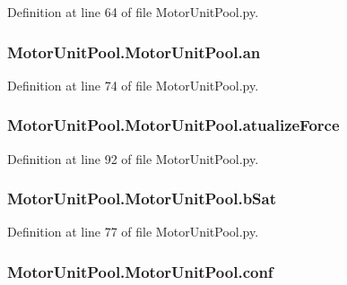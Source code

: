 Definition at line 64 of file Motor\-Unit\-Pool.\-py.

\hypertarget{class_motor_unit_pool_1_1_motor_unit_pool_ac72c67b4a1f6134965ab77e2d798b5a4}{
\subsubsection[{an}]{\setlength{\rightskip}{0pt plus 5cm}Motor\-Unit\-Pool.\-Motor\-Unit\-Pool.\-an}}\label{class_motor_unit_pool_1_1_motor_unit_pool_ac72c67b4a1f6134965ab77e2d798b5a4}


Definition at line 74 of file Motor\-Unit\-Pool.\-py.

\hypertarget{class_motor_unit_pool_1_1_motor_unit_pool_a21f9a6a5d113b5b0f67a3557c47ebd5a}{
\subsubsection[{atualize\-Force}]{\setlength{\rightskip}{0pt plus 5cm}Motor\-Unit\-Pool.\-Motor\-Unit\-Pool.\-atualize\-Force}}\label{class_motor_unit_pool_1_1_motor_unit_pool_a21f9a6a5d113b5b0f67a3557c47ebd5a}


Definition at line 92 of file Motor\-Unit\-Pool.\-py.

\hypertarget{class_motor_unit_pool_1_1_motor_unit_pool_a4e107835e34b4f56d06b9b28c143fe40}{
\subsubsection[{b\-Sat}]{\setlength{\rightskip}{0pt plus 5cm}Motor\-Unit\-Pool.\-Motor\-Unit\-Pool.\-b\-Sat}}\label{class_motor_unit_pool_1_1_motor_unit_pool_a4e107835e34b4f56d06b9b28c143fe40}


Definition at line 77 of file Motor\-Unit\-Pool.\-py.

\hypertarget{class_motor_unit_pool_1_1_motor_unit_pool_a3b2ee8f3e5500bfdc8fa731a5cb7d622}{
\subsubsection[{conf}]{\setlength{\rightskip}{0pt plus 5cm}Motor\-Unit\-Pool.\-Motor\-Unit\-Pool.\-conf}}\label{class_motor_unit_pool_1_1_motor_unit_pool_a3b2ee8f3e5500bfdc8fa731a5cb7d622}


